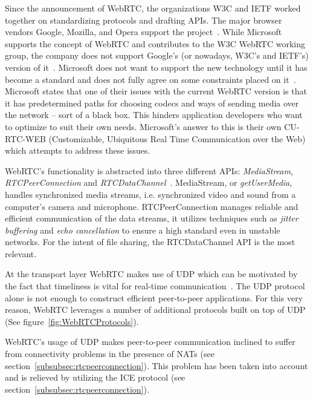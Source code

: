 Since the announcement of WebRTC, the organizations W3C and IETF worked together on standardizing protocols and drafting APIs. The major browser vendors Google, Mozilla, and Opera support the project~\cite{WebRTCAndMicrosoft:2012:Online}. While Microsoft supports the concept of WebRTC and contributes to the W3C WebRTC working group, the company does not support Google's (or nowadays, W3C's and IETF's) version of it~\cite{WebRTCAndMicrosoft:2012:Online}. Microsoft does not want to support the new technology until it has become a standard and does not fully agree on some constraints placed on it~\cite{WebRTCAndMicrosoft:2012:Online}. Microsoft states that one of their issues with the current WebRTC version is that it has predetermined paths for choosing codecs and ways of sending media over the network – sort of a black box. This hinders application developers who want to optimize to suit their own needs. Microsoft's answer to this is their own CU-RTC-WEB (Customizable, Ubiquitous Real Time Communication over the Web) which attempts to address these issues.

WebRTC's functionality is abstracted into three different APIs: \emph{MediaStream}, \emph{RTCPeerConnection} and \emph{RTCDataChannel}~\cite{WebRTCBasics:2012:Online}. MediaStream, or \emph{getUserMedia}, handles synchronized media streams, i.e. synchronized video and sound from a computer's camera and microphone. RTCPeerConnection manages reliable and efficient communication of the data streams, it utilizes techniques such as \emph{jitter buffering} and \emph{echo cancellation} to ensure a high standard even in unstable networks. For the intent of file sharing, the RTCDataChannel API is the most relevant.

At the transport layer WebRTC makes use of UDP which can be motivated by the fact that timeliness is vital for real-time communication~\cite{HighPerfBrowserNetworking:Online}. The UDP protocol alone is not enough to construct efficient peer-to-peer applications. For this very reason, WebRTC leverages a number of additional protocols built on top of UDP (See figure~\ref{fig:WebRTCProtocols}).

WebRTC's usage of UDP makes peer-to-peer communication inclined to suffer from connectivity problems in the presence of NATs (see section~\ref{subsubsec:rtcpeerconnection}). This problem has been taken into account and is relieved by utilizing the ICE protocol (see section~\ref{subsubsec:rtcpeerconnection}).

